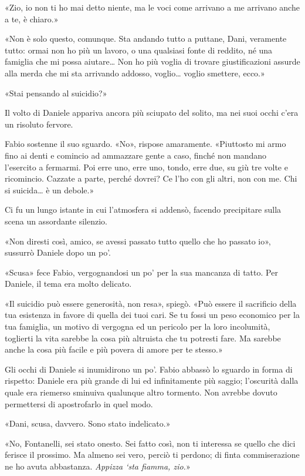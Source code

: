 «Zio, io non ti ho mai detto niente, ma le voci come arrivano a me arrivano anche a te, è chiaro.»

«Non è solo questo, comunque. Sta andando tutto a puttane, Dani, veramente tutto: ormai non ho più un lavoro, o una qualsiasi fonte di reddito, né una famiglia che mi possa aiutare\ldots{} Non ho più voglia di trovare giustificazioni assurde alla merda che mi sta arrivando addosso, voglio\ldots{} voglio smettere, ecco.»

«Stai pensando al suicidio?»

Il volto di Daniele appariva ancora più sciupato del solito, ma nei suoi occhi c'era un risoluto fervore.

Fabio sostenne il suo sguardo. «No», rispose amaramente. «Piuttosto mi armo fino ai denti e comincio ad ammazzare gente a caso, finché non mandano l'esercito a fermarmi. Poi erre uno, erre uno, tondo, erre due, su giù tre volte e ricomincio. Cazzate a parte, perché dovrei? Ce l'ho con gli altri, non con me. Chi si suicida\ldots{} è un debole.»

Ci fu un lungo istante in cui l'atmosfera si addensò, facendo precipitare sulla scena un assordante silenzio.

«Non diresti così, amico, se avessi passato tutto quello che ho passato io», sussurrò Daniele dopo un po'.

«Scusa» fece Fabio, vergognandosi un po' per la sua mancanza di tatto. Per Daniele, il tema era molto delicato.

«Il suicidio può essere generosità, non resa», spiegò. «Può essere il sacrificio della tua esistenza in favore di quella dei tuoi cari. Se tu fossi un peso economico per la tua famiglia, un motivo di vergogna ed un pericolo per la loro incolumità, toglierti la vita sarebbe la cosa più altruista che tu potresti fare. Ma sarebbe anche la cosa più facile e più povera di amore per te stesso.»

Gli occhi di Daniele si inumidirono un po'. Fabio abbassò lo sguardo in forma di rispetto: Daniele era più grande di lui ed infinitamente più saggio; l'oscurità dalla quale era riemerso sminuiva qualunque altro tormento. Non avrebbe dovuto permettersi di apostrofarlo in quel modo.

«Dani, scusa, davvero. Sono stato indelicato.»

«No, Fontanelli, sei stato onesto. Sei fatto così, non ti interessa se quello che dici ferisce il prossimo. Ma almeno sei vero, perciò ti perdono; di finta commiserazione ne ho avuta abbastanza. \emph{Appizza `sta fiamma, zio.}»

